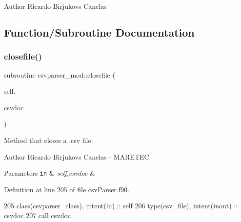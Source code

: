 \begin{DoxyAuthor}{Author}
Ricardo Birjukovs Canelas 
\end{DoxyAuthor}


\subsection{Function/\+Subroutine Documentation}
\mbox{\label{namespacecsvparser__mod_a8f56a69c948d139a3e9c88476f25305d}} 
\subsubsection{\texorpdfstring{closefile()}{closefile()}}
{\footnotesize\ttfamily subroutine csvparser\+\_\+mod\+::closefile (\begin{DoxyParamCaption}\item[{class(\mbox{\hyperlink{structcsvparser__mod_1_1csvparser__class}{csvparser\+\_\+class}}), intent(in)}]{self,  }\item[{type(csv\+\_\+file), intent(inout)}]{csvdoc }\end{DoxyParamCaption})\hspace{0.3cm}{\ttfamily [private]}}



Method that closes a .csv file. 

\begin{DoxyAuthor}{Author}
Ricardo Birjukovs Canelas -\/ M\+A\+R\+E\+T\+EC 
\end{DoxyAuthor}

\begin{DoxyParams}[1]{Parameters}
\mbox{\tt in}  & {\em self,csvdoc} & \\
\hline
\end{DoxyParams}


Definition at line 205 of file csv\+Parser.\+f90.


\begin{DoxyCode}
205     \textcolor{keywordtype}{class}(csvparser\_class), \textcolor{keywordtype}{intent(in)} :: self
206     \textcolor{keywordtype}{type}(csv\_file), \textcolor{keywordtype}{intent(inout)} :: csvdoc
207     \textcolor{keyword}{call }csvdoc%
\end{DoxyCode}
\mbox{\label{namespacecsvparser__mod_ae966faafebb8c4035e12e0bb24de717c}} 
